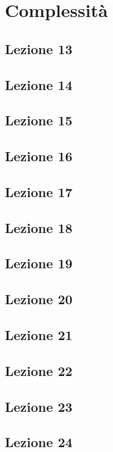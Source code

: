\chapter{Complessità}

\section{Lezione 13}

\section{Lezione 14}

\section{Lezione 15}

\section{Lezione 16}



\section{Lezione 17}

\section{Lezione 18}

\section{Lezione 19}

\section{Lezione 20}

\section{Lezione 21}

\section{Lezione 22}

\section{Lezione 23}

\section{Lezione 24}

